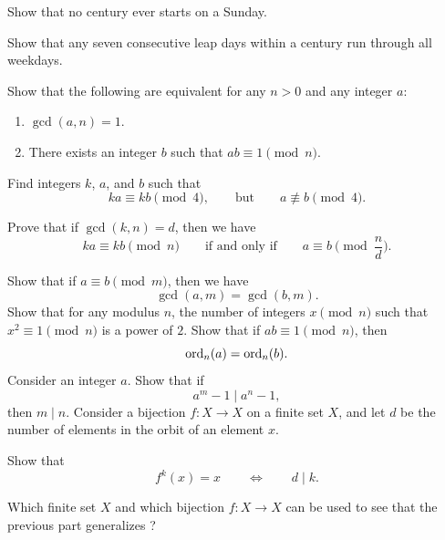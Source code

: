 \begin{routine}
  \exercise
  \begin{subexenum}
  \item Show that no century ever starts on a Sunday.
  \item Show that any seven consecutive leap days within a century run through all weekdays.
  \end{subexenum}
  \exercise Show that the following are equivalent for any $n>0$ and any integer $a$:
  \begin{enumerate}
  \item $\gcd(a,n)=1$.
  \item There exists an integer $b$ such that $ab\equiv 1\pmod{n}$.
  \end{enumerate}
  \exercise
  \begin{subexenum}
  \item Find integers $k$, $a$, and $b$ such that
    \begin{equation*}
      ka\equiv kb\pmod{4},\qquad\text{but}\qquad a\nequiv b\pmod{4}.
    \end{equation*}
  \item Prove that if $\gcd(k,n)=d$, then we have
    \begin{equation*}
      ka\equiv kb\pmod{n}\qquad\text{if and only if}\qquad a\equiv b\pmod{\frac{n}{d}}.
    \end{equation*}
  \end{subexenum}
  \exercise Show that if $a\equiv b\pmod{m}$, then we have
  \begin{equation*}
    \gcd(a,m)=\gcd(b,m).
  \end{equation*}
  \exercise Show that for any modulus $n$, the number of integers $x\pmod{n}$ such that $x^2\equiv 1\pmod{n}$ is a power of $2$.
  \exercise Show that if $ab\equiv 1\pmod{n}$, then
  \begin{equation*}
    \operatorname{ord}_n(a)=\operatorname{ord}_n(b).
  \end{equation*}
  \exercise Consider an integer $a$. Show that if
  \begin{equation*}
    a^m-1 \mid a^n-1,
  \end{equation*}
  then $m\mid n$.
  \exercise \label{exercise:orbit-order-theorem}Consider a bijection $f:X\to X$ on a finite set $X$, and let $d$ be the number of elements in the orbit of an element $x$.
  \begin{subexenum}
  \item Show that
    \begin{equation*}
      f^k(x)=x\qquad\Leftrightarrow\qquad d\mid k.
    \end{equation*}
  \item Which finite set $X$ and which bijection $f:X\to X$ can be used to see that the previous part generalizes ?
  \end{subexenum}
\end{routine}

